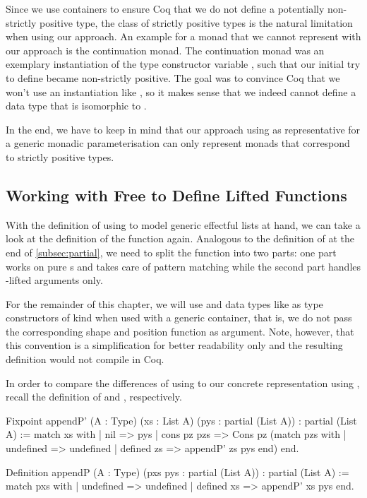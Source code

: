Since we use containers to ensure Coq that we do not define a potentially non\--strictly positive type, the class of strictly positive types is the natural limitation when using our approach.
An example for a monad that we cannot represent with our approach is the continuation monad.
The continuation monad  was an exemplary instantiation of the type constructor variable , such that our initial try to define  became non\--strictly positive.
The goal was to convince Coq that we won't use an instantiation like , so it makes sense that we indeed cannot define a data type that is isomorphic to .

In the end, we have to keep in mind that our approach using  as representative for a generic monadic parameterisation can only represent monads that correspond to strictly positive types.

\subsection{Working with Free to Define Lifted Functions}
\label{subsec:liftedFunctions}

With the definition of  using  to model generic effectful lists at hand, we can take a look at the definition of the function  again.
Analogous to the definition of  at the end of \autoref{subsec:partial}, we need to split the function into two parts: one part works on pure s and takes care of pattern matching while the second part handles \--lifted arguments only.

For the remainder of this chapter, we will use  and data types like  as type constructors of kind  when used with a generic container, that is, we do not pass the corresponding shape and position function as argument.
Note, however, that this convention is a simplification for better readability only and the resulting definition would not compile in Coq.

In order to compare the differences of using  to our concrete representation using , recall the definition of  and , respectively.

\begin{coqcode}
Fixpoint appendP' (A : Type) (xs : List A) (pys : partial (List A))
  : partial (List A) :=
  match xs with
  | nil         => pys
  | cons pz pzs => Cons pz (match pzs with
                            | undefined  => undefined
                            | defined zs => appendP' zs pys
                            end)
  end.

Definition appendP (A : Type) (pxs pys : partial (List A))
  : partial (List A) :=
  match pxs with
  | undefined  => undefined
  | defined xs => appendP' xs pys
  end.
\end{coqcode}

